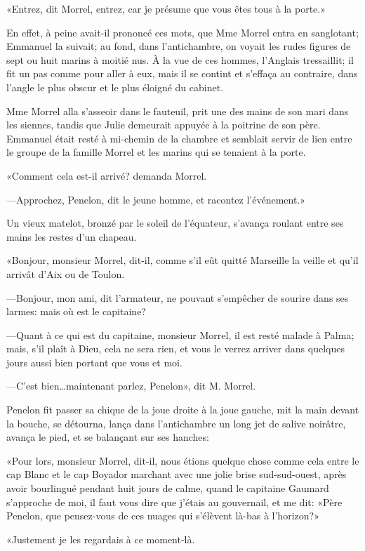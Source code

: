 «Entrez, dit Morrel, entrez, car je présume que vous êtes tous à la porte.»

En effet, à peine avait-il prononcé ces mots, que Mme Morrel entra en sanglotant; Emmanuel la suivait; au fond, dans l'antichambre, on voyait les rudes figures de sept ou huit marins à moitié nus. À la vue de ces hommes, l'Anglais tressaillit; il fit un pas comme pour aller à eux, mais il se contint et s'effaça au contraire, dans l'angle le plus obscur et le plus éloigné du cabinet.

Mme Morrel alla s'asseoir dans le fauteuil, prit une des mains de son mari dans les siennes, tandis que Julie demeurait appuyée à la poitrine de son père. Emmanuel était resté à mi-chemin de la chambre et semblait servir de lien entre le groupe de la famille Morrel et les marins qui se tenaient à la porte.

«Comment cela est-il arrivé? demanda Morrel.

—Approchez, Penelon, dit le jeune homme, et racontez l'événement.»

Un vieux matelot, bronzé par le soleil de l'équateur, s'avança roulant entre ses mains les restes d'un chapeau.

«Bonjour, monsieur Morrel, dit-il, comme s'il eût quitté Marseille la veille et qu'il arrivât d'Aix ou de Toulon.

—Bonjour, mon ami, dit l'armateur, ne pouvant s'empêcher de sourire dans ses larmes: mais où est le capitaine?

—Quant à ce qui est du capitaine, monsieur Morrel, il est resté malade à Palma; mais, s'il plaît à Dieu, cela ne sera rien, et vous le verrez arriver dans quelques jours aussi bien portant que vous et moi.

—C'est bien\dots maintenant parlez, Penelon», dit M. Morrel.

Penelon fit passer sa chique de la joue droite à la joue gauche, mit la main devant la bouche, se détourna, lança dans l'antichambre un long jet de salive noirâtre, avança le pied, et se balançant sur ses hanches:

«Pour lors, monsieur Morrel, dit-il, nous étions quelque chose comme cela entre le cap Blanc et le cap Boyador marchant avec une jolie brise sud-sud-ouest, après avoir bourlingué pendant huit jours de calme, quand le capitaine Gaumard s'approche de moi, il faut vous dire que j'étais au gouvernail, et me dit: «Père Penelon, que pensez-vous de ces nuages qui s'élèvent là-bas à l'horizon?»

«Justement je les regardais à ce moment-là.


